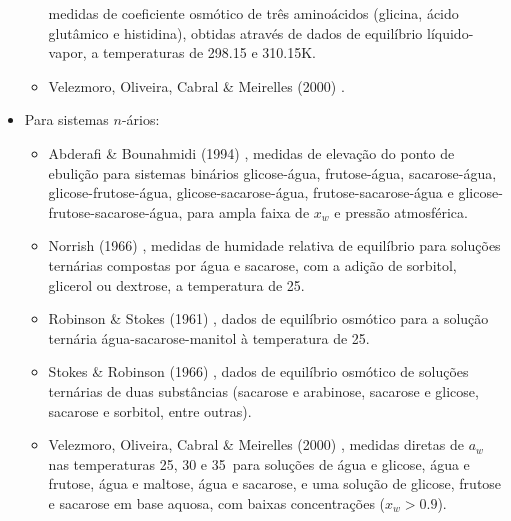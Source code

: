 \documentclass[
	12pt,				%
	openright,
	twoside,
	a4paper,			%
	english,			%
	french,				%
	spanish,			%
	brazil				%
	]{abntex2}
\begin{document}
\begin{itemize}
\begin{itemize}
				medidas de coeficiente osmótico de três aminoácidos
				(glicina, ácido glutâmico e histidina), obtidas
				através de dados de equilíbrio líquido-vapor, a
				temperaturas de 298.15 e 310.15K.
			\item Velezmoro, Oliveira, Cabral \& Meirelles (2000)
				\cite{velezmoro2000}.
		\end{itemize}
	\item Para sistemas $n$-ários:
		\begin{itemize}
			\item Abderafi \& Bounahmidi (1994) \cite{abderafi1994},
				medidas de elevação do ponto de ebulição
				para sistemas binários glicose-água,
				frutose-água, sacarose-água,
				glicose-frutose-água, glicose-sacarose-água,
				frutose-sacarose-água e
				glicose-frutose-sacarose-água, para ampla
				faixa de $x_w$ e pressão atmosférica.
			\item Norrish (1966) \cite{norrish1966}, medidas de
				humidade relativa de equilíbrio para soluções
				ternárias compostas por água e sacarose, com a
				adição de sorbitol, glicerol ou dextrose, a
				temperatura de 25\textcelsius.
			\item Robinson \& Stokes (1961) \cite{stokes1961},
				dados de equilíbrio osmótico para a solução
				ternária água-sacarose-manitol à temperatura
				de 25\textcelsius.
			\item Stokes \& Robinson (1966) \cite{stokes1966},
				dados de equilíbrio osmótico de soluções
				ternárias de duas substâncias (sacarose e
				arabinose, sacarose e glicose, sacarose e
				sorbitol, entre outras).
			\item Velezmoro, Oliveira, Cabral \& Meirelles (2000)
				\cite{velezmoro2000}, medidas diretas de $a_w$ nas
				temperaturas 25, 30 e 35\textcelsius\ para soluções
				de água e glicose, água e frutose, água e maltose,
				água e sacarose, e uma solução de glicose, frutose
				e sacarose em base aquosa, com baixas concentrações
				($x_w > 0.9$).
		\end{itemize}
\end{itemize}
\end{document}
